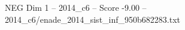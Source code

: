 \begin{textsample}{NEG Dim 1 – 2014\_c6 – Score -9.00 – 2014\_c6/enade\_2014\_sist\_inf\_950b682283.txt}
\end{textsample}
